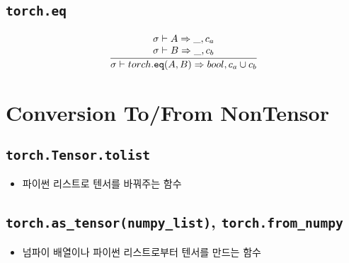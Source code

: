 \documentclass{article}
\begin{document}
\subsection*{\texttt{torch.eq}}
\begin{align*}
  \frac
  {
    \begin{array}{l}
      \sigma \vdash A \Rightarrow \_, c_a \\
      \sigma \vdash B \Rightarrow \_, c_b
    \end{array}
  }
  {
    \sigma \vdash torch.\mathtt{eq(}A, B\mathtt{)} \Rightarrow bool, c_a \cup c_b
  }
\end{align*}


\section*{Conversion To/From NonTensor}
\subsection*{\texttt{torch.Tensor.tolist}}
\begin{itemize}
  \item 파이썬 리스트로 텐서를 바꿔주는 함수
\end{itemize}

\subsection*{\texttt{torch.as\_tensor(numpy\_list)}, \texttt{torch.from\_numpy}}
\begin{itemize}
  \item 넘파이 배열이나 파이썬 리스트로부터 텐서를 만드는 함수
\end{itemize}
\end{document}
